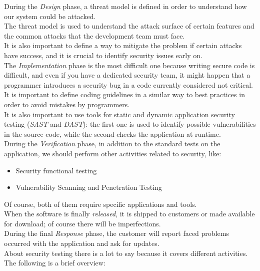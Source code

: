 \documentclass[12pt]{report}
\begin{document}
{During the \emph{Design} phase, a threat model is defined in order to understand how our system could be attacked.\\
The threat model is used to understand the attack surface of certain features and the common attacks that the development team must face.\\
It is also important to define a way to mitigate the problem if certain attacks have success, and it is crucial to identify security issues early on.\\

The \emph{Implementation} phase is the most difficult one because writing secure code is difficult, and even if you have a dedicated security team, it might happen that a programmer introduces a security bug in a code currently considered not critical.\\
It is important to define coding guidelines in a similar way to best practices in order to avoid mistakes by programmers.\\
It is also important to use tools for static and dynamic application security testing (\emph{SAST} and \emph{DAST}): the first one is used to
identify possible vulnerabilities in the source code, while the second checks the application at runtime.\\

During the \emph{Verification} phase, in addition to the standard tests on the application, we should perform other activities related to security, like:

\begin{itemize}
\setlength{\itemindent}{+4mm}
\item Security functional testing
\item Vulnerability Scanning and Penetration Testing
\end{itemize}

Of course, both of them require specific applications and tools.\\

When the software is finally \emph{released}, it is shipped to customers or made available for download; of course there will be imperfections.\\

During the final \emph{Response} phase, the customer will report faced problems occurred with the application and ask for updates.\\

About security testing there is a lot to say because it covers different activities. The following is a brief overview:

}
\end{document}
